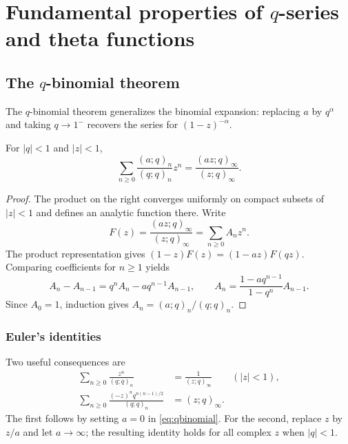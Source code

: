 \chapter{Fundamental properties of \texorpdfstring{$q$}{q}-series and theta functions}
\label{ch:qseries}
\section{The \texorpdfstring{$q$}{q}-binomial theorem}
The $q$-binomial theorem generalizes the binomial expansion: replacing $a$
by $q^\alpha$ and taking $q\to1^-$ recovers the series for $(1-z)^{-\alpha}$.
\begin{theorem}\label{thm:qbinomial}
For $|q|<1$ and $|z|<1$,
\begin{equation}\label{eq:qbinomial}
 \sum_{n\ge0}\frac{(a;q)_n}{(q;q)_n}z^n
 =\frac{(az;q)_\infty}{(z;q)_\infty}.
\end{equation}
\end{theorem}
\begin{proof}
The product on the right converges uniformly on compact subsets of
$|z|<1$ and defines an analytic function there. Write
\[
 F(z)=\frac{(az;q)_\infty}{(z;q)_\infty}=\sum_{n\ge0}A_nz^n.
\]
The product representation gives $(1-z)F(z)=(1-az)F(qz)$.
Comparing coefficients for $n\ge1$ yields
\[
 A_n-A_{n-1}=q^nA_n-aq^{n-1}A_{n-1},\qquad
 A_n=\frac{1-aq^{n-1}}{1-q^n}A_{n-1}.
\]
Since $A_0=1$, induction gives $A_n=(a;q)_n/(q;q)_n$.
\end{proof}

\subsection{Euler's identities}
Two useful consequences are
\begin{align}
 \sum_{n\ge0}\frac{z^n}{(q;q)_n}
 &=\frac1{(z;q)_\infty}\qquad(|z|<1),\label{eq:euler-reciprocal}\\
 \sum_{n\ge0}\frac{(-z)^nq^{n(n-1)/2}}{(q;q)_n}
 &=(z;q)_\infty.\label{eq:euler-product}
\end{align}
The first follows by setting $a=0$ in \eqref{eq:qbinomial}.
For the second, replace $z$ by $z/a$ and let $a\to\infty$;
the resulting identity holds for all complex $z$ when $|q|<1$.


